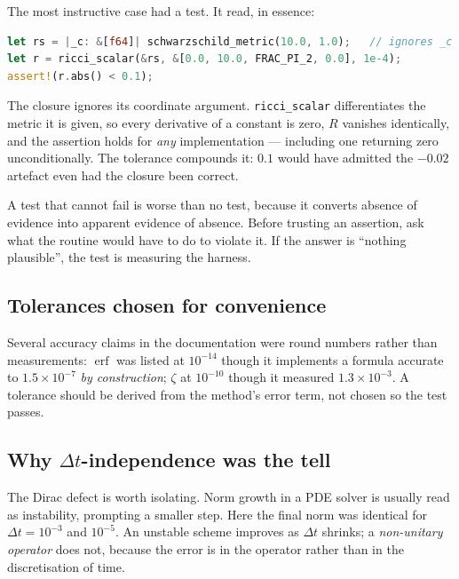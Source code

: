 \documentclass[11pt,a4paper]{article}
\theoremstyle{plain}
\theoremstyle{definition}
\begin{document}
The most instructive case had a test. It read, in essence:

\begin{lstlisting}[language=Rust]
let rs = |_c: &[f64]| schwarzschild_metric(10.0, 1.0);   // ignores _c
let r = ricci_scalar(&rs, &[0.0, 10.0, FRAC_PI_2, 0.0], 1e-4);
assert!(r.abs() < 0.1);
\end{lstlisting}

The closure ignores its coordinate argument. \texttt{ricci\_scalar}
differentiates the metric it is given, so every derivative of a constant is
zero, $R$ vanishes identically, and the assertion holds for \emph{any}
implementation --- including one returning zero unconditionally. The tolerance
compounds it: $0.1$ would have admitted the $-0.02$ artefact even had the
closure been correct.

\begin{lesson}
A test that cannot fail is worse than no test, because it converts absence of
evidence into apparent evidence of absence. Before trusting an assertion, ask
what the routine would have to do to violate it. If the answer is ``nothing
plausible'', the test is measuring the harness.
\end{lesson}

\subsection{Tolerances chosen for convenience}

Several accuracy claims in the documentation were round numbers rather than
measurements: $\operatorname{erf}$ was listed at $10^{-14}$ though it implements
a formula accurate to $1.5\times10^{-7}$ \emph{by construction}; $\zeta$ at
$10^{-10}$ though it measured $1.3\times10^{-3}$. A tolerance should be derived
from the method's error term, not chosen so the test passes.

\subsection{Why $\Delta t$-independence was the tell}

The Dirac defect is worth isolating. Norm growth in a PDE solver is usually read
as instability, prompting a smaller step. Here the final norm was identical for
$\Delta t=10^{-3}$ and $10^{-5}$. An unstable scheme improves as $\Delta t$
shrinks; a \emph{non-unitary operator} does not, because the error is in the
operator rather than in the discretisation of time.
\end{document}
